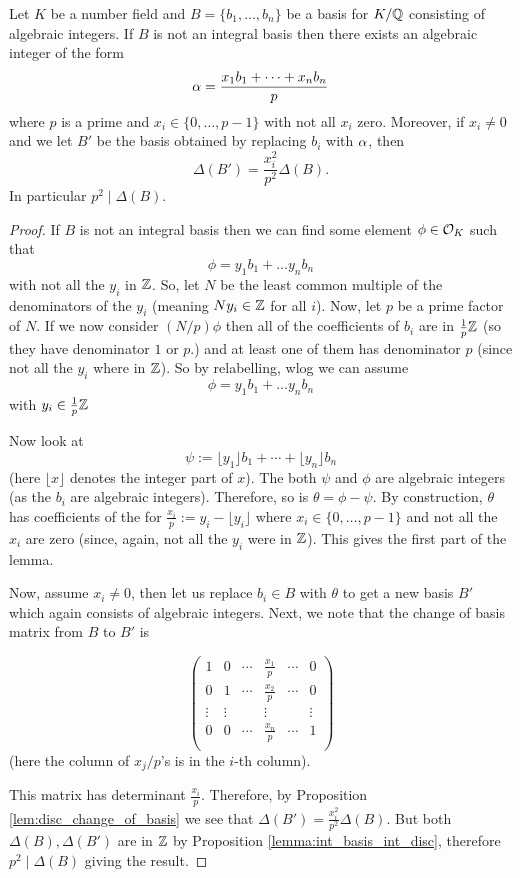 \begin{lemma}\label{lemma:disc_int_basis}
	Let $K$ be a number field and $B=\{b_1,\dots,b_n\}$ be a basis for $K/\mathbb{Q}$ consisting of algebraic integers. If $B$ is not an integral basis then there exists an algebraic integer of the form \[\alpha=\frac{x_1b_1+\cdots+x_nb_n}{p}\] where $p$ is a prime and $x_i \in \{0,\dots,p-1\}$ with not all $x_i$ zero. Moreover, if $x_i \neq 0$ and we let $B'$ be the basis obtained by replacing $b_i$ with $\alpha$, then \[\Delta(B')= \frac{x_i^2}{p^2} \Delta(B).\] In particular $p^2 \mid \Delta(B)$.
\end{lemma}

\begin{proof}
	If $B$ is not an integral basis then we can find some element $\phi \in \mathcal{O}_K$ such that \[\phi=y_1b_1+\dots y_nb_n\] with not all the $y_i$ in $\mathbb{Z}$. So, let $N$ be the least common multiple of the denominators of the $y_i$ (meaning $Ny_i \in \mathbb{Z}$ for all $i$). Now, let $p$ be a prime factor of $N$. If we now consider $(N/p)\phi$ then all of the coefficients of $b_i$ are in $\frac{1}{p} \mathbb{Z}$ (so they have denominator $1$ or $p$.) and at least one of them has denominator $p$ (since not all the $y_i$ where in $\mathbb{Z}$). So by relabelling, wlog we can assume \[\phi=y_1b_1+\dots y_nb_n\] with $y_i \in  \frac{1}{p} \mathbb{Z}$

	Now look at \[\psi:=\lfloor y_1 \rfloor b_1+\cdots+\lfloor y_n \rfloor b_n\] (here $\lfloor x \rfloor$ denotes the integer part of $x$). The both $\psi$ and $\phi$ are algebraic integers (as the $b_i$ are algebraic integers). Therefore, so is $\theta=\phi-\psi$. By construction, $\theta$ has coefficients of the for $\frac{x_i}{p}:=y_i-\lfloor y_i \rfloor$ where $x_i \in \{0,\dots,p-1\}$ and not all the $x_i$ are zero (since, again, not all the $y_i$ were in $\mathbb{Z}$). This gives the first part of the lemma.

	Now, assume $x_i \neq 0$, then let us replace $b_i \in B$ with $\theta$ to get a new basis $B'$ which again consists of algebraic integers. Next, we note that the change of basis matrix from $B$ to $B'$ is

	\[ \left( \begin{matrix}
		1&0&\cdots& \frac{x_1}{p}& \cdots &0 \\
		0&1&\cdots& \frac{x_2}{p}& \cdots &0 \\
		\vdots& \vdots&&\vdots&&\vdots \\
		0&0&\cdots& \frac{x_n}{p}& \cdots &1 \\
	\end{matrix}                          \right) \](here the column of $x_j/p$'s is in the $i$-th column).

	This matrix has determinant $\frac{x_i}{p}.$ Therefore, by 	Proposition \ref{lem:disc_change_of_basis} we see that $\Delta(B')=\frac{x_i^2}{p^2}\Delta(B)$. But both $\Delta(B),\Delta(B')$ are  in $\mathbb{Z}$ by Proposition \ref{lemma:int_basis_int_disc}, therefore $p^2 \mid \Delta(B)$ giving the result.
\end{proof}

